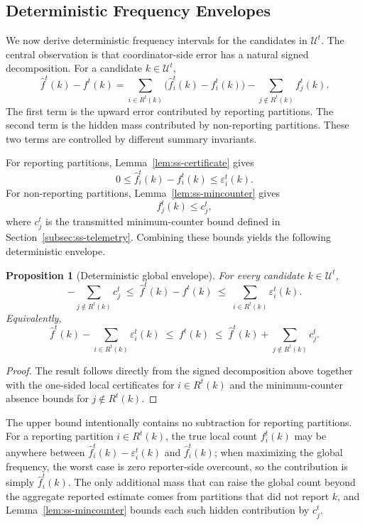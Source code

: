 \documentclass[sigconf, nonacm]{acmart}
\newtheorem{proposition}{Proposition}
\begin{document}
\subsection{Deterministic Frequency Envelopes}
\label{subsec:freq-envelopes}

We now derive deterministic frequency intervals for the candidates in \(\mathcal U^t\). The central observation is that coordinator-side error has a natural signed decomposition. For a candidate \(k \in \mathcal U^t\),
\[
\hat f^t(k) - f^t(k)
=
\sum_{i \in R^t(k)} \bigl(\hat f_i^t(k) - f_i^t(k)\bigr)
-
\sum_{j \notin R^t(k)} f_j^t(k).
\]
The first term is the upward error contributed by reporting partitions. The second term is the hidden mass contributed by non-reporting partitions. These two terms are controlled by different summary invariants.

For reporting partitions, Lemma~\ref{lem:ss-certificate} gives
\[
0
\le
\hat f_i^t(k) - f_i^t(k)
\le
\varepsilon_i^t(k).
\]
For non-reporting partitions, Lemma~\ref{lem:ss-mincounter} gives
\[
f_j^t(k)
\le
c_j^t,
\]
where \(c_j^t\) is the transmitted minimum-counter bound defined in Section~\ref{subsec:ss-telemetry}.
Combining these bounds yields the following deterministic envelope.

\begin{proposition}[Deterministic global envelope]
\label{prop:global-envelope}
For every candidate \(k \in \mathcal U^t\),
\[
-\sum_{j \notin R^t(k)} c_j^t
\;\le\;
\hat f^t(k) - f^t(k)
\;\le\;
\sum_{i \in R^t(k)} \varepsilon_i^t(k).
\]
Equivalently,
\[
\hat f^t(k) - \sum_{i \in R^t(k)} \varepsilon_i^t(k)
\;\le\;
f^t(k)
\;\le\;
\hat f^t(k) + \sum_{j \notin R^t(k)} c_j^t.
\]
\end{proposition}

\begin{proof}
The result follows directly from the signed decomposition above together with the one-sided local certificates for \(i \in R^t(k)\) and the minimum-counter absence bounds for \(j \notin R^t(k)\).
\end{proof}

The upper bound intentionally contains no subtraction for reporting partitions. For a reporting partition \(i\in R^t(k)\), the true local count \(f_i^t(k)\) may be anywhere between \(\hat f_i^t(k)-\varepsilon_i^t(k)\) and \(\hat f_i^t(k)\); when maximizing the global frequency, the worst case is zero reporter-side overcount, so the contribution is simply \(\hat f_i^t(k)\). The only additional mass that can raise the global count beyond the aggregate reported estimate comes from partitions that did not report \(k\), and Lemma~\ref{lem:ss-mincounter} bounds each such hidden contribution by \(c_j^t\).
\end{document}
